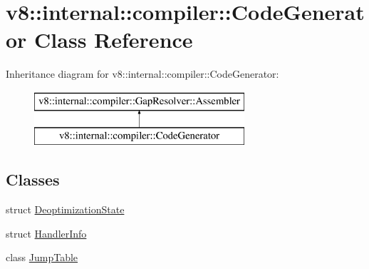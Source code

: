 \hypertarget{classv8_1_1internal_1_1compiler_1_1_code_generator}{}\section{v8\+:\+:internal\+:\+:compiler\+:\+:Code\+Generator Class Reference}
\label{classv8_1_1internal_1_1compiler_1_1_code_generator}
Inheritance diagram for v8\+:\+:internal\+:\+:compiler\+:\+:Code\+Generator\+:\begin{figure}[H]
\begin{center}
\leavevmode
\includegraphics[height=2.000000cm]{classv8_1_1internal_1_1compiler_1_1_code_generator}
\end{center}
\end{figure}
\subsection*{Classes}
\begin{DoxyCompactItemize}
\item 
struct \hyperlink{structv8_1_1internal_1_1compiler_1_1_code_generator_1_1_deoptimization_state}{Deoptimization\+State}
\item 
struct \hyperlink{structv8_1_1internal_1_1compiler_1_1_code_generator_1_1_handler_info}{Handler\+Info}
\item 
class \hyperlink{classv8_1_1internal_1_1compiler_1_1_code_generator_1_1_jump_table}{Jump\+Table}
\end{DoxyCompactItemize}
